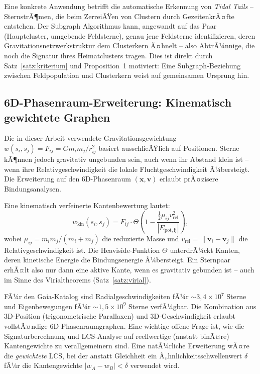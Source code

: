 ﻿\documentclass[a4paper,12pt]{report}
\theoremstyle{definition}
\begin{document}
Eine konkrete Anwendung betrifft die automatische Erkennung von \emph{Tidal Tails} -- SternstrÃ¶men, die beim ZerreiÃŸen von Clustern durch GezeitenkrÃ¤fte entstehen. Der Subgraph Algorithmus kann, angewandt auf das Paar (Hauptcluster, umgebende Feldsterne), genau jene Feldsterne identifizieren, deren Gravitationsnetzwerkstruktur dem Clusterkern Ã¤hnelt -- also AbtrÃ¼nnige, die noch die Signatur ihres Heimatclusters tragen. Dies ist direkt durch Satz~\ref{satz:kriterium} und Proposition~1 motiviert: Eine Subgraph-Beziehung zwischen Feldpopulation und Clusterkern weist auf gemeinsamen Ursprung hin.

\subsection{6D-Phasenraum-Erweiterung: Kinematisch gewichtete Graphen}

Die in dieser Arbeit verwendete Gravitationsgewichtung $w(s_i, s_j) = F_{ij} = G m_i m_j / r_{ij}^2$ basiert ausschlieÃŸlich auf Positionen. Sterne kÃ¶nnen jedoch gravitativ ungebunden sein, auch wenn ihr Abstand klein ist -- wenn ihre Relativgeschwindigkeit die lokale Fluchtgeschwindigkeit Ã¼bersteigt. Die Erweiterung auf den 6D-Phasenraum $({\mathbf{x}}, {\mathbf{v}})$ erlaubt prÃ¤zisere Bindungsanalysen.

Eine kinematisch verfeinerte Kantenbewertung lautet:
\[
w_\mathrm{kin}(s_i, s_j) = F_{ij} \cdot \Theta\!\left(1 - \frac{\frac{1}{2}\mu_{ij} v_\mathrm{rel}^2}{|E_\mathrm{pot,ij}|}\right),
\]
wobei $\mu_{ij} = m_i m_j / (m_i + m_j)$ die reduzierte Masse und $v_\mathrm{rel} = \|\mathbf{v}_i - \mathbf{v}_j\|$ die Relativgeschwindigkeit ist. Die Heaviside-Funktion $\Theta$ unterdrÃ¼ckt Kanten, deren kinetische Energie die Bindungsenergie Ã¼bersteigt. Ein Sternpaar erhÃ¤lt also nur dann eine aktive Kante, wenn es gravitativ gebunden ist -- auch im Sinne des Virialtheorems (Satz~\ref{satz:virial}).

FÃ¼r den Gaia-Katalog sind Radialgeschwindigkeiten fÃ¼r $\sim 3{,}4 \times 10^7$ Sterne und Eigenbewegungen fÃ¼r $\sim 1{,}5 \times 10^9$ Sterne verfÃ¼gbar. Die Kombination aus 3D-Position (trigonometrische Parallaxen) und 3D-Geschwindigkeit erlaubt vollstÃ¤ndige 6D-Phasenraumgraphen. Eine wichtige offene Frage ist, wie die Signaturberechnung und LCS-Analyse auf reellwertige (anstatt binÃ¤re) Kantengewichte zu verallgemeinern sind. Eine natÃ¼rliche Erweiterung wÃ¤re die \emph{gewichtete} LCS, bei der anstatt Gleichheit ein Ã„hnlichkeitsschwellenwert $\delta$ fÃ¼r die Kantengewichte $|w_A - w_B| < \delta$ verwendet wird.
\end{document}
